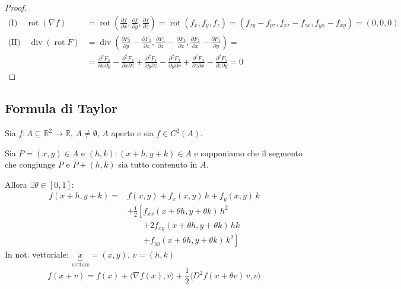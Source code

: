 \begin{proof}
\begin{align*}
\text{(I)}\quad \operatorname{rot}(\nabla f) &= \operatorname{rot}\left( \frac{\partial f}{\partial x}, \frac{\partial f}{\partial y}, \frac{\partial f}{\partial z} \right) = \operatorname{rot}(f_x, f_y, f_z) = (f_{zy} - f_{yz}, f_{xz} - f_{zx}, f_{yx} - f_{xy}) = (0, 0, 0) \\[6pt]
\text{(II)}\quad \operatorname{div}(\operatorname{rot} F) &= \operatorname{div}\left( \frac{\partial F_3}{\partial y} - \frac{\partial F_2}{\partial z}, \frac{\partial F_1}{\partial z} - \frac{\partial F_3}{\partial x}, \frac{\partial F_2}{\partial x} - \frac{\partial F_1}{\partial y} \right) = \\
&= \frac{\partial^2 F_3}{\partial x \partial y} - \frac{\partial^2 F_2}{\partial x \partial z} + \frac{\partial^2 F_1}{\partial y \partial z} - \frac{\partial^2 F_3}{\partial y \partial x} + \frac{\partial^2 F_2}{\partial z \partial x} - \frac{\partial^2 F_1}{\partial z \partial y} = 0
\end{align*}
\end{proof}

\subsection{Formula di Taylor}

\begin{theorem}
Sia $f : A \subseteq \mathbb{R}^2 \to \mathbb{R}$, $A \neq \emptyset$, $A$ aperto e sia $f \in C^2(A)$.

Sia $P = (x, y) \in A$ e $(h, k) : (x + h, y + k) \in A$ e supponiamo che il segmento che congiunge $P$ e $P + (h, k)$ sia tutto contenuto in $A$.

Allora $\exists \theta \in [0, 1]$:
\[
\begin{aligned}
f(x + h, y + k) ={}& f(x, y) + f_x(x, y)\, h + f_y(x, y)\, k \\
&+ \frac{1}{2} \left[
f_{xx}(x + \theta h, y + \theta k)\, h^2 \right.\\
&\qquad \left. + 2 f_{xy}(x + \theta h, y + \theta k)\, hk \right.\\
&\qquad \left. + f_{yy}(x + \theta h, y + \theta k)\, k^2
\right]
\end{aligned}
\]
In not. vettoriale: $\underbrace{x}_{\text{vettore}} = (x, y)$, $v = (h, k)$
\[
f(x + v) = f(x) + \langle \nabla f(x), v \rangle + \frac{1}{2} \langle D^2 f(x + \theta v)\, v, v \rangle
\]
\end{theorem}

